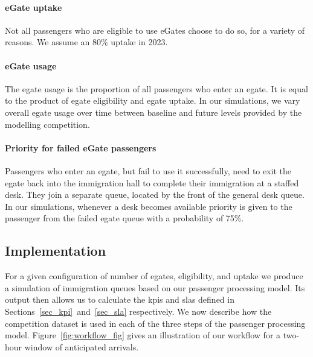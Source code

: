 \documentclass[10pt]{article}
\begin{document}
\paragraph{eGate uptake} 
Not all passengers who are eligible to use eGates choose to do so, for a variety of reasons. We assume an 80\% uptake in 2023. 

\paragraph{eGate usage}
The \gls{egate} usage is the proportion of all passengers who enter an \gls{egate}. It is equal to the product of \gls{egate} eligibility and \gls{egate} uptake. In our simulations, we vary overall \gls{egate} usage over time between baseline and future levels provided by the modelling competition.

\paragraph{Priority for failed eGate passengers}
Passengers who enter an \gls{egate}, but fail to use it successfully, need to exit the \gls{egate} back into the immigration hall to complete their immigration at a staffed desk. They join a separate queue, located by the front of the general desk queue. In our simulations, whenever a desk becomes available priority is given to the passenger from the failed \gls{egate} queue with a probability of 75\%.


\subsection{Implementation}

For a given configuration of number of \glspl{egate}, eligibility, and uptake we produce a simulation of immigration queues based on our passenger processing model. Its output then allows us to calculate the \glspl{kpi} and \glspl{sla} defined in Sections~\ref{sec_kpi}~and~\ref{sec_sla} respectively.  We now describe how the competition dataset is used in each of the three steps of the passenger processing model. Figure~\ref{fig:workflow_fig} gives an illustration of our workflow for a two-hour window of anticipated arrivals.
\end{document}
